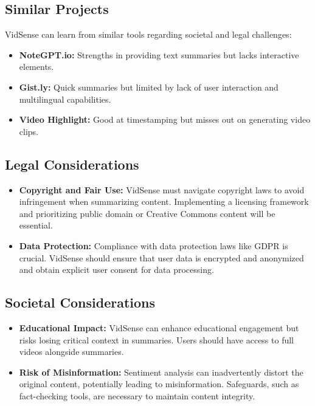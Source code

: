 \documentclass{bscs}
\begin{document}
\subsection{Similar Projects}

VidSense can learn from similar tools regarding societal and legal challenges:

\begin{itemize}
    \item \textbf{NoteGPT.io:} Strengths in providing text summaries but lacks interactive elements. 
    
    \item \textbf{Gist.ly:} Quick summaries but limited by lack of user interaction and multilingual
capabilities.  

    \item \textbf{Video Highlight:} Good at timestamping but misses out on generating video clips.

\end{itemize}

\subsection{Legal Considerations}

\begin{itemize}
    \item \textbf{Copyright and Fair Use:} VidSense must navigate copyright laws to avoid infringement when summarizing content. Implementing a licensing framework and prioritizing public
domain or Creative Commons content will be essential. 
    
    \item \textbf{Data Protection:} Compliance with data protection laws like GDPR is crucial. VidSense should ensure that user data is encrypted and anonymized and obtain explicit user consent for data processing.  

\end{itemize}

\subsection{Societal Considerations}

\begin{itemize}
    \item \textbf{Educational Impact:} VidSense can enhance educational engagement but risks losing
critical context in summaries. Users should have access to full videos alongside
summaries. 
    
    \item \textbf{Risk of Misinformation:} Sentiment analysis can inadvertently distort the original
content, potentially leading to misinformation. Safeguards, such as fact-checking tools,
are necessary to maintain content integrity.
\end{itemize}
\end{document}
